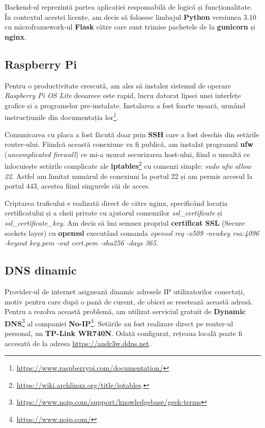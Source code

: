 Backend-ul reprezintă partea aplicației responsabilă de logică și funcționalitate. În contextul acestei licențe, am decis să folosesc limbajul \textbf{Python} versiunea 3.10 cu microframework-ul \textbf{Flask} către care sunt trimise pachetele de la \textbf{gunicorn} și \textbf{nginx}.

\subsection{Raspberry Pi}

Pentru o productivitate crescută, am ales să instalez sistemul de operare \emph{Raspberry Pi OS Lite} deoarece este rapid, lucru datorat lipsei unei interfețe grafice și a programelor pre-instalate. Instalarea a fost foarte ușoară, urmând instrucțiunile din documentația lor\footnote{\url{https://www.raspberrypi.com/documentation/}}.

Comunicarea cu placa a fost făcută doar prin \textbf{SSH} care a fost deschis din setările router-ului. Fiindcă această conexiune va fi publică, am instalat programul \textbf{ufw} (\emph{uncomplicated firewall}) ce mi-a ușurat securizarea host-ului, fiind o unealtă ce înlocuiește setările complicate ale \textbf{iptables}\footnote{\url{https://wiki.archlinux.org/title/iptables}.} cu comenzi simple: \emph{sudo ufw allow 22}. Astfel am limitat numărul de conexiuni la portul 22 și am permis accesul la portul 443, acestea fiind singurele  căi de acces.

Criptarea traficului e realizată direct de către nginx, specificând locația certificatului și a cheii private cu ajutorul comenzilor \emph{ssl\_certificate} și \emph{ssl\_certificate\_key}. Am decis să îmi semnez propriul \textbf{certificat SSL} (Secure sockets layer) cu \textbf{openssl} executând comanda \emph{openssl req -x509 -newkey rsa:4096 -keyout key.pem -out cert.pem -sha256 -days 365}. 

\subsection{DNS dinamic}

Provider-ul de internet asignează dinamic adresele IP utilizatorilor conectați, motiv pentru care după o pană de curent, de obicei se resetează această adresă. Pentru a rezolva această problemă, am utilizat serviciul gratuit de \textbf{Dynamic DNS}\footnote{\url{https://www.noip.com/support/knowledgebase/geek-terms}} al companiei \textbf{No-IP}\footnote{\url{https://www.noip.com/}}. Setările au fost realizare direct pe router-ul personal, un \textbf{TP-Link WR740N}. Odată configurat, rețeaua locală poate fi accesată de la adresa \url{https://andr3w.ddns.net}.

